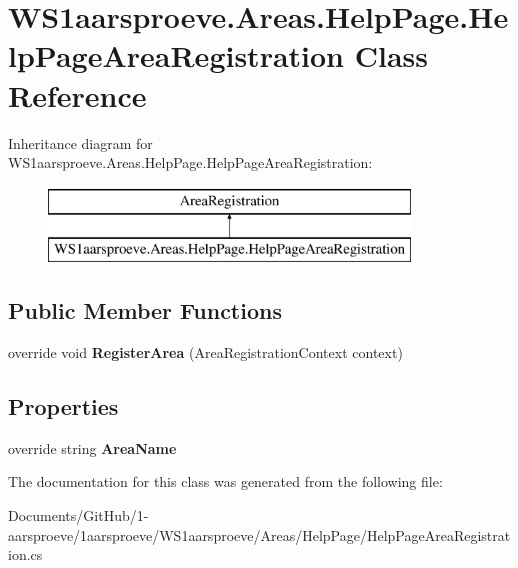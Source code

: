 \hypertarget{class_w_s1aarsproeve_1_1_areas_1_1_help_page_1_1_help_page_area_registration}{}\section{W\+S1aarsproeve.\+Areas.\+Help\+Page.\+Help\+Page\+Area\+Registration Class Reference}
\label{class_w_s1aarsproeve_1_1_areas_1_1_help_page_1_1_help_page_area_registration}
Inheritance diagram for W\+S1aarsproeve.\+Areas.\+Help\+Page.\+Help\+Page\+Area\+Registration\+:\begin{figure}[H]
\begin{center}
\leavevmode
\includegraphics[height=2.000000cm]{class_w_s1aarsproeve_1_1_areas_1_1_help_page_1_1_help_page_area_registration}
\end{center}
\end{figure}
\subsection*{Public Member Functions}
\begin{DoxyCompactItemize}
\item 
\hypertarget{class_w_s1aarsproeve_1_1_areas_1_1_help_page_1_1_help_page_area_registration_a4521a2d5b11d5975c7a414674d44435e}{}override void {\bfseries Register\+Area} (Area\+Registration\+Context context)\label{class_w_s1aarsproeve_1_1_areas_1_1_help_page_1_1_help_page_area_registration_a4521a2d5b11d5975c7a414674d44435e}

\end{DoxyCompactItemize}
\subsection*{Properties}
\begin{DoxyCompactItemize}
\item 
\hypertarget{class_w_s1aarsproeve_1_1_areas_1_1_help_page_1_1_help_page_area_registration_af667b0bd093b2f9b247159990b0f7ea1}{}override string {\bfseries Area\+Name}\label{class_w_s1aarsproeve_1_1_areas_1_1_help_page_1_1_help_page_area_registration_af667b0bd093b2f9b247159990b0f7ea1}

\end{DoxyCompactItemize}


The documentation for this class was generated from the following file\+:\begin{DoxyCompactItemize}
\item 
Documents/\+Git\+Hub/1-\/aarsproeve/1aarsproeve/\+W\+S1aarsproeve/\+Areas/\+Help\+Page/Help\+Page\+Area\+Registration.\+cs\end{DoxyCompactItemize}
